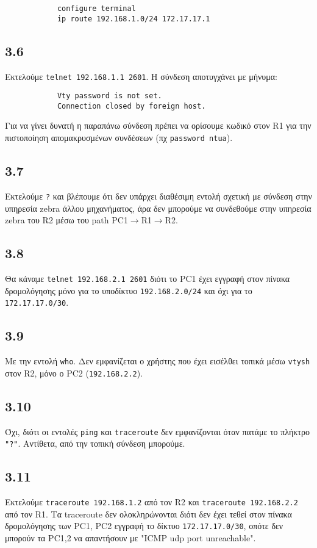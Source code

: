 \documentclass[a4paper, 12pt]{article}
\begin{document}
		\begin{verbatim}
			configure terminal
			ip route 192.168.1.0/24 172.17.17.1
		\end{verbatim}

	\subsection*{3.6}
		Εκτελούμε \verb|telnet 192.168.1.1 2601|. Η σύνδεση αποτυγχάνει με μήνυμα:
		
		\begin{verbatim}
			Vty password is not set.
			Connection closed by foreign host.
		\end{verbatim}
		
		Για να γίνει δυνατή η παραπάνω σύνδεση πρέπει να ορίσουμε κωδικό στον R1 για την πιστοποίηση απομακρυσμένων συνδέσεων (πχ \verb|password ntua|).

	\subsection*{3.7}
		Εκτελούμε \verb|?| και βλέπουμε ότι δεν υπάρχει διαθέσιμη εντολή σχετική με σύνδεση στην υπηρεσία zebra άλλου μηχανήματος, άρα δεν μπορούμε να συνδεθούμε στην υπηρεσία zebra του R2 μέσω του path PC1$\rightarrow$R1$\rightarrow$R2.

	\subsection*{3.8}
		Θα κάναμε \verb|telnet 192.168.2.1 2601| διότι το PC1 έχει εγγραφή στον πίνακα δρομολόγησης μόνο για το υποδίκτυο \verb|192.168.2.0/24| και όχι για το \verb|172.17.17.0/30|.

	\subsection*{3.9}
		Με την εντολή \verb|who|. Δεν εμφανίζεται ο χρήστης που έχει εισέλθει τοπικά μέσω \verb|vtysh| στον R2, μόνο ο PC2 (\verb|192.168.2.2|).

	\subsection*{3.10}
		Όχι, διότι οι εντολές \verb|ping| και \verb|traceroute| δεν εμφανίζονται όταν πατάμε το πλήκτρο \verb|"?"|. Αντίθετα, από την τοπική σύνδεση μπορούμε.

	\subsection*{3.11}
		Εκτελούμε \verb|traceroute 192.168.1.2| από τον R2 και \verb|traceroute 192.168.2.2| από τον R1. Τα traceroute δεν ολοκληρώνονται διότι δεν έχει τεθεί στον πίνακα δρομολόγησης των PC1, PC2 εγγραφή το δίκτυο \verb|172.17.17.0/30|, οπότε δεν μπορούν τα PC1,2 να απαντήσουν με "ICMP udp port unreachable".
		
\end{document}
